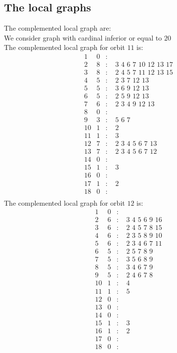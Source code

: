 \documentclass[12pt]{article}
\begin{document}
\subsection{The local graphs}
The complemented local graph are:\\
We consider graph with cardinal inferior or equal to $20$\\
The complemented local graph for orbit $11$ is:
\begin{equation*}
\begin{array}{rrcl}
1&0&:&\\
2&8&:&\,\,3\,\,4\,\,6\,\,7\,\,10\,\,12\,\,13\,\,17\\
3&8&:&\,\,2\,\,4\,\,5\,\,7\,\,11\,\,12\,\,13\,\,15\\
4&5&:&\,\,2\,\,3\,\,7\,\,12\,\,13\\
5&5&:&\,\,3\,\,6\,\,9\,\,12\,\,13\\
6&5&:&\,\,2\,\,5\,\,9\,\,12\,\,13\\
7&6&:&\,\,2\,\,3\,\,4\,\,9\,\,12\,\,13\\
8&0&:&\\
9&3&:&\,\,5\,\,6\,\,7\\
10&1&:&\,\,2\\
11&1&:&\,\,3\\
12&7&:&\,\,2\,\,3\,\,4\,\,5\,\,6\,\,7\,\,13\\
13&7&:&\,\,2\,\,3\,\,4\,\,5\,\,6\,\,7\,\,12\\
14&0&:&\\
15&1&:&\,\,3\\
16&0&:&\\
17&1&:&\,\,2\\
18&0&:&\\
\end{array}
\end{equation*}
The complemented local graph for orbit $12$ is:
\begin{equation*}
\begin{array}{rrcl}
1&0&:&\\
2&6&:&\,\,3\,\,4\,\,5\,\,6\,\,9\,\,16\\
3&6&:&\,\,2\,\,4\,\,5\,\,7\,\,8\,\,15\\
4&6&:&\,\,2\,\,3\,\,5\,\,8\,\,9\,\,10\\
5&6&:&\,\,2\,\,3\,\,4\,\,6\,\,7\,\,11\\
6&5&:&\,\,2\,\,5\,\,7\,\,8\,\,9\\
7&5&:&\,\,3\,\,5\,\,6\,\,8\,\,9\\
8&5&:&\,\,3\,\,4\,\,6\,\,7\,\,9\\
9&5&:&\,\,2\,\,4\,\,6\,\,7\,\,8\\
10&1&:&\,\,4\\
11&1&:&\,\,5\\
12&0&:&\\
13&0&:&\\
14&0&:&\\
15&1&:&\,\,3\\
16&1&:&\,\,2\\
17&0&:&\\
18&0&:&\\
\end{array}
\end{equation*}
\end{document}
